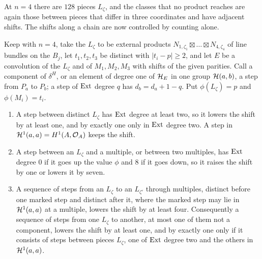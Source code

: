 At $n=4$ there are $128$ pieces $L_{\zeta}$, and the classes that no
product reaches are again those between pieces that differ in three
coordinates and have adjacent shifts. The shifts along a chain are now
controlled by counting alone.

\begin{lemma}[Shifts along chains at $n=4$]\label{lem:efourshifts}
Keep  with $n=4$, take the $L_{\zeta}$ to be external
products $N_{1,\zeta_{1}}\boxtimes\dots\boxtimes N_{4,\zeta_{4}}$ of line
bundles on the $B_{j}$, let $t_{1},t_{2},t_{3}$ be distinct with
$|t_{i}-p|\ge2$, and let $E$ be a convolution of the $L_{\zeta}$ and of
$M_{1},M_{2},M_{3}$ with shifts of the given parities. Call a component of
$\delta^{H}$, or an element of degree one of $\mathcal{H}_{E}$ in one group
$\mathcal{H}(a,b)$, a step from $P_{a}$ to $P_{b}$; a step of $\operatorname{Ext}$ degree $q$ has
$d_{b}=d_{a}+1-q$. Put $\phi(L_{\zeta})=p$ and $\phi(M_{i})=t_{i}$.
\begin{enumerate}[label=\textup{(\roman*)},leftmargin=2.6em,itemsep=2pt]
\item A step between distinct $L_{\zeta}$ has $\operatorname{Ext}$ degree at least two, so
  it lowers the shift by at least one, and by exactly one only in $\operatorname{Ext}$
  degree two. A step in $\mathcal{H}^{1}(a,a)=H^{1}(A,\mathcal{O}_{A})$ keeps the shift.
\item A step between an $L_{\zeta}$ and a multiple, or between two
  multiples, has $\operatorname{Ext}$ degree $0$ if it goes up the value $\phi$ and $8$ if
  it goes down, so it raises the shift by one or lowers it by seven.
\item A sequence of steps from an $L_{\zeta}$ to an $L_{\zeta'}$ through
  multiples, distinct before one marked step and distinct after it, where
  the marked step may lie in $\mathcal{H}^{1}(a,a)$ at a multiple, lowers the shift
  by at least four. Consequently a sequence of steps from one $L_{\zeta}$ to
  another, at most one of them not a component, lowers the shift by at least
  one, and by exactly one only if it consists of steps between pieces
  $L_{\zeta}$, one of $\operatorname{Ext}$ degree two and the others in $\mathcal{H}^{1}(a,a)$.
\end{enumerate}
\end{lemma}

